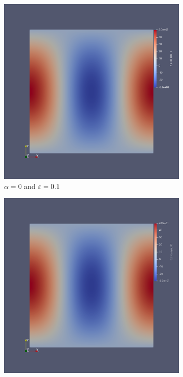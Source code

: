 \documentclass[12pt]{ociamthesis}
\begin{document}
\begin{figure}[H]
 \begin{subfigure}{0.44\textwidth}
     \includegraphics[width=\textwidth]{Pics/uf/F_E1a_eps1.png}
     \caption{$\alpha=0$ and $\varepsilon = 0.1$}
 \end{subfigure}
   \begin{subfigure}{0.44\textwidth}
     \includegraphics[width=\textwidth]{Pics/uf/F_E1a_eps10.png}

\end{subfigure}
\end{figure}
\end{document}
